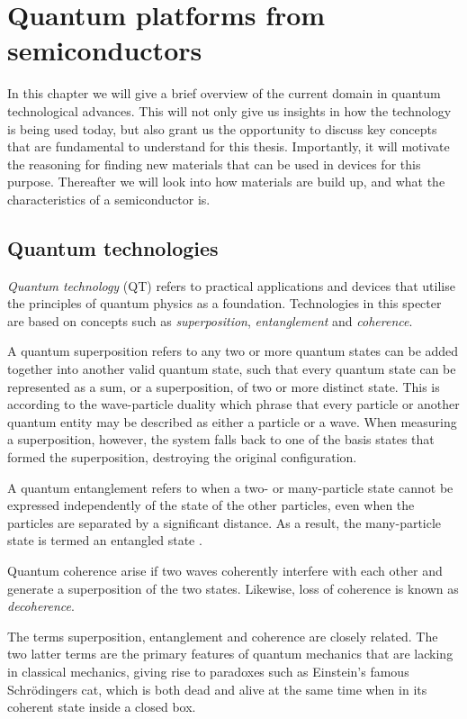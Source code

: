 \chapter{Quantum platforms from semiconductors}

In this chapter we will give a brief overview of the current domain in quantum technological advances. This will not only give us insights in how the technology is being used today, but also grant us the opportunity to discuss key concepts that are fundamental to understand for this thesis. Importantly, it will motivate the reasoning for finding new materials that can be used in devices for this purpose. Thereafter we will look into how materials are build up, and what the characteristics of a semiconductor is.

\section{Quantum technologies}

\textit{Quantum technology} (QT) refers to practical applications and devices that utilise the principles of quantum physics as a foundation. Technologies in this specter are based on concepts such as \textit{superposition}, \textit{entanglement} and \textit{coherence}.

A quantum superposition refers to any two or more quantum states can be added together into another valid quantum state, such that every quantum state can be represented as a sum, or a superposition, of two or more distinct state. This is according to the wave-particle duality which phrase that every particle or another quantum entity may be described as either a particle or a wave. When measuring a superposition, however, the system falls back to one of the basis states that formed the superposition, destroying the original configuration.

A quantum entanglement refers to when a two- or many-particle state cannot be expressed independently of the state of the other particles, even when the particles are separated by a significant distance. As a result, the many-particle state is termed an entangled state \cite{Griffiths2017}.

Quantum coherence arise if two waves coherently interfere with each other and generate a superposition of the two states. Likewise, loss of coherence is known as \textit{decoherence}.

The terms superposition, entanglement and coherence are closely related. The two latter terms are the primary features of quantum mechanics that are lacking in classical mechanics, giving rise to paradoxes such as Einstein's famous Schrödingers cat, which is both dead and alive at the same time when in its coherent state inside a closed box.

